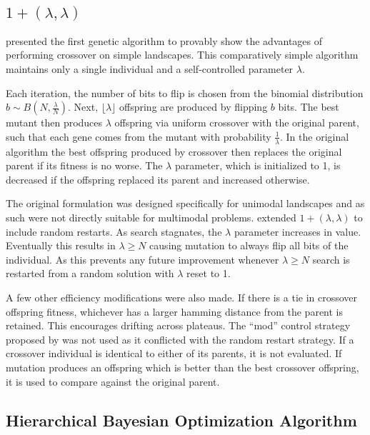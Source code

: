 \documentclass[twoside]{article}
\begin{document}
\subsection{$1+(\lambda, \lambda)$}
\cite{doerr:2013:lambdalambda} presented the first genetic algorithm to provably show
the advantages of performing crossover on simple landscapes. This comparatively simple
algorithm maintains only a single individual and a self-controlled parameter $\lambda$.

Each iteration, the number of bits to flip is chosen from the binomial distribution $b\sim B(N, \frac{\lambda}{N})$.
Next, $\lfloor\lambda\rfloor$ offspring are produced by flipping $b$ bits. The
best mutant then produces $\lambda$ offspring via uniform crossover with the original parent, such that each gene comes from the
mutant with probability $\frac{1}{\lambda}$. In the original algorithm the best
offspring produced by crossover then replaces the original parent if its fitness is no worse.
The $\lambda$ parameter, which is initialized to 1, is decreased if the offspring replaced
its parent and increased otherwise.

The original formulation was designed specifically for unimodal landscapes and as such were
not directly suitable for multimodal problems. \cite{goldman:2014:p3} extended $1+(\lambda, \lambda)$
to include random restarts. As search stagnates, the $\lambda$ parameter increases in value. Eventually
this results in $\lambda \ge N$ causing mutation to always flip all bits of the individual.
As this prevents any future improvement whenever $\lambda \ge N$ search is restarted from a random solution with $\lambda$
reset to 1.

A few other efficiency modifications were also made. If there is a tie in crossover offspring fitness,
whichever has a larger hamming distance from the parent is retained. This encourages drifting across plateaus.
The ``mod'' control strategy proposed by \cite{doerr:2013:lambdalambda} was not used as it conflicted with
the random restart strategy.
If a crossover individual is identical to either of its parents, it is not evaluated.
If mutation produces an offspring which is better than the best crossover offspring, it is used to compare
against the original parent.


\subsection{Hierarchical Bayesian Optimization Algorithm}
\end{document}
